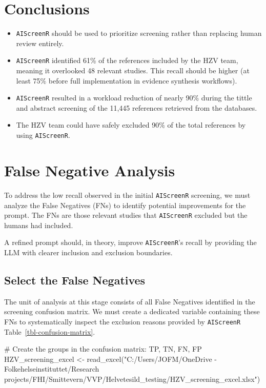 \documentclass[
  letterpaper,
  DIV=11,
  numbers=noendperiod]{scrartcl}
\newenvironment{Shaded}{\begin{snugshade}}{\end{snugshade}}
\newcommand{\CommentTok}[1]{\textcolor[rgb]{0.37,0.37,0.37}{#1}}
\newcommand{\FunctionTok}[1]{\textcolor[rgb]{0.28,0.35,0.67}{#1}}
\newcommand{\NormalTok}[1]{\textcolor[rgb]{0.00,0.23,0.31}{#1}}
\newcommand{\OtherTok}[1]{\textcolor[rgb]{0.00,0.23,0.31}{#1}}
\newcommand{\StringTok}[1]{\textcolor[rgb]{0.13,0.47,0.30}{#1}}
\begin{document}
\section{Conclusions}\label{conclusions}

\begin{itemize}
\item
  \texttt{AIScreenR} should be used to prioritize screening rather than
  replacing human review entirely.
\item
  \texttt{AIScreenR} identified 61\% of the references included by the
  HZV team, meaning it overlooked 48 relevant studies. This recall
  should be higher (at least 75\% before full implementation in evidence
  synthesis workflows).
\item
  \texttt{AIScreenR} resulted in a workload reduction of nearly 90\%
  during the tittle and abstract screening of the 11,445 references
  retrieved from the databases.
\item
  The HZV team could have safely excluded 90\% of the total references
  by using \texttt{AIScreenR}.
\end{itemize}

\section{False Negative Analysis}\label{false-negative-analysis}

To address the low recall observed in the initial \texttt{AIScreenR}
screening, we must analyze the False Negatives (FNs) to identify
potential improvements for the prompt. The FNs are those relevant
studies that \texttt{AIScreenR} excluded but the humans had included.

A refined prompt should, in theory, improve \texttt{AIScreenR}'s recall
by providing the LLM with clearer inclusion and exclusion boundaries.

\subsection{Select the False
Negatives}\label{select-the-false-negatives}

The unit of analysis at this stage consists of all False Negatives
identified in the screening confusion matrix. We must create a dedicated
variable containing these FNs to systematically inspect the exclusion
reasons provided by \texttt{AIScreenR} Table~\ref{tbl-confusion-matrix}.

\begin{Shaded}
\begin{Highlighting}[]
\CommentTok{\# Create the groups in the confusion matrix: TP, TN, FN, FP}
\NormalTok{HZV\_screening\_excel }\OtherTok{\textless{}{-}} \FunctionTok{read\_excel}\NormalTok{(}\StringTok{"C:/Users/JOFM/OneDrive {-} Folkehelseinstituttet/Research projects/FHI/Smittevern/VVP/Helvetesild\_testing/HZV\_screening\_excel.xlsx"}\NormalTok{)}
\end{Highlighting}
\end{Shaded}
\end{document}
